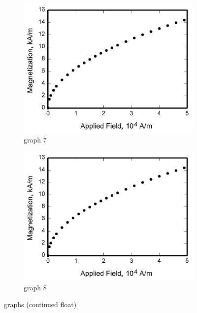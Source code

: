 \begin{figure}[H]\ContinuedFloat
    \begin{subfigure}[t]{0.48\textwidth}
        \centering
        \includegraphics[width=1.0\textwidth]{Images/graph.jpg}
        \caption{graph 7}
        \label{subfig:graph7}
    \end{subfigure}
    \hfill
    \begin{subfigure}[t]{0.48\textwidth}
        \centering
        \includegraphics[width=1.0\textwidth]{Images/graph.jpg}
        \caption{graph 8}
        \label{subfig:graph8}
    \end{subfigure}
    \caption{graphs (continued float)}
    \label{fig:graph_contfloat}
\end{figure}

